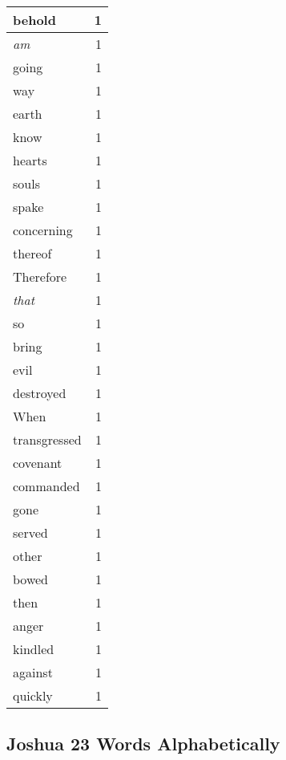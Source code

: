 \begin{center}
\begin{longtable}{l|r}
behold & 1\\ \hline 
\emph{am} & 1\\ \hline 
going & 1\\ \hline 
way & 1\\ \hline 
earth & 1\\ \hline 
know & 1\\ \hline 
hearts & 1\\ \hline 
souls & 1\\ \hline 
spake & 1\\ \hline 
concerning & 1\\ \hline 
thereof & 1\\ \hline 
Therefore & 1\\ \hline 
\emph{that} & 1\\ \hline 
so & 1\\ \hline 
bring & 1\\ \hline 
evil & 1\\ \hline 
destroyed & 1\\ \hline 
When & 1\\ \hline 
transgressed & 1\\ \hline 
covenant & 1\\ \hline 
commanded & 1\\ \hline 
gone & 1\\ \hline 
served & 1\\ \hline 
other & 1\\ \hline 
bowed & 1\\ \hline 
then & 1\\ \hline 
anger & 1\\ \hline 
kindled & 1\\ \hline 
against & 1\\ \hline 
quickly & 1\\ \hline 
\end{longtable}
\end{center}





\subsection{Joshua 23 Words Alphabetically}


\normalsize
 
